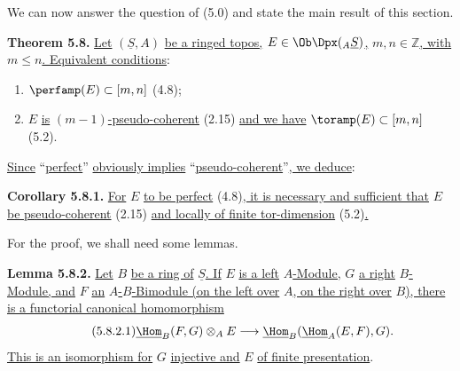 We can now answer the question of (5.0) and state the main result of this section.

\textbf{Theorem 5.8.} \uline{Let} \((\underline{S},A)\) \uline{be a ringed topos,} \(E\in\Ob\Dpx({}_A \underline{S})\)\uline{,} \(m,n\in\mathbb Z\)\uline{, with} \(m\leq n\)\uline{. Equivalent conditions}:
\begin{enumerate}[label=(\roman*)]
\item \(\perfamp(E)\subset[m,n]\) (4.8);
\item \(E\) \uline{is} \((m-1)\)\uline{-pseudo-coherent} (2.15) \uline{and we have} \(\toramp(E)\subset[m,n]\) (5.2).
\end{enumerate}
\uline{Since} ``\uline{perfect}'' \uline{obviously implies} ``\uline{pseudo-coherent}''\uline{, we deduce}:

%
\textbf{Corollary 5.8.1.} \uline{For} \(E\) \uline{to be perfect} (4.8)\uline{, it is necessary and sufficient that} \(E\) \uline{be pseudo-coherent} (2.15) \uline{and locally of finite tor-dimension} (5.2)\uline{.}

For the proof, we shall need some lemmas.

\textbf{Lemma 5.8.2.} \uline{Let} \(B\) \uline{be a ring of} \(\underline{S}\)\uline{. If} \(E\) \uline{is a left} \(A\)\uline{-Module,} \(G\) \uline{a right} \(B\)\uline{-Module, and} \(F\) \uline{an} \(A\)\uline{-}\(B\)\uline{-Bimodule (on the left over} \(A\)\uline{, on the right over} \(B\)\uline{), there is a functorial canonical homomorphism}
\begin{equation}\tag{5.8.2.1}
  \underline{\Hom}_B(F,G)\otimes_A E
  \longrightarrow
  \underline{\Hom}_B(\underline{\Hom}_A(E,F),G).
\end{equation}
\uline{This is an isomorphism for} \(G\) \uline{injective and} \(E\) \uline{of finite presentation}.


